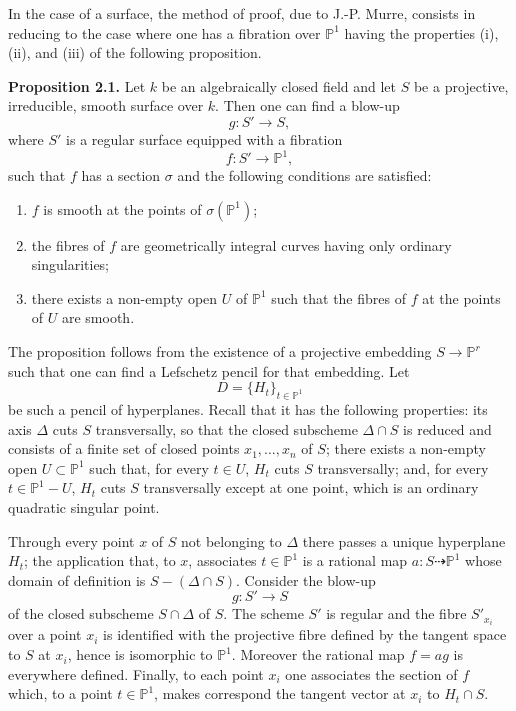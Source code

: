 \documentclass[11pt]{article}
\begin{document}
In the case of a surface, the method of proof, due to J.-P. Murre, consists in reducing to the case where one has a fibration over $\mathbb P^1$ having the properties (i), (ii), and (iii) of the following proposition.

\textbf{Proposition 2.1.} Let $k$ be an algebraically closed field and let $S$ be a projective, irreducible, smooth surface over $k$. Then one can find a blow-up
\[
 g:S'\longrightarrow S,
\]
where $S'$ is a regular surface equipped with a fibration
\[
 f:S'\longrightarrow \mathbb P^1,
\]
such that $f$ has a section $\sigma$ and the following conditions are satisfied:
\begin{enumerate}[label=\textup{(\roman*)}]
\item $f$ is smooth at the points of $\sigma(\mathbb P^1)$;
\item the fibres of $f$ are geometrically integral curves having only ordinary singularities;
\item there exists a non-empty open $U$ of $\mathbb P^1$ such that the fibres of $f$ at the points of $U$ are smooth.
\end{enumerate}

The proposition follows from the existence of a projective embedding $S\to \mathbb P^r$ such that one can find a Lefschetz pencil for that embedding. Let
\[
 D=\{H_t\}_{t\in\mathbb P^1}
\]
be such a pencil of hyperplanes. Recall that it has the following properties: its axis $\Delta$ cuts $S$ transversally, so that the closed subscheme $\Delta\cap S$ is reduced and consists of a finite set of closed points $x_1,\ldots,x_n$ of $S$; there exists a non-empty open $U\subset\mathbb P^1$ such that, for every $t\in U$, $H_t$ cuts $S$ transversally; and, for every $t\in\mathbb P^1-U$, $H_t$ cuts $S$ transversally except at one point, which is an ordinary quadratic singular point.

Through every point $x$ of $S$ not belonging to $\Delta$ there passes a unique hyperplane $H_t$; the application that, to $x$, associates $t\in\mathbb P^1$ is a rational map $a:S\dashrightarrow\mathbb P^1$ whose domain of definition is $S-(\Delta\cap S)$. Consider the blow-up
\[
 g:S'\longrightarrow S
\]
of the closed subscheme $S\cap\Delta$ of $S$. The scheme $S'$ is regular and the fibre $S'_{x_i}$ over a point $x_i$ is identified with the projective fibre defined by the tangent space to $S$ at $x_i$, hence is isomorphic to $\mathbb P^1$. Moreover the rational map $f=ag$ is everywhere defined. Finally, to each point $x_i$ one associates the section of $f$ which, to a point $t\in\mathbb P^1$, makes correspond the tangent vector at $x_i$ to $H_t\cap S$.
\end{document}
